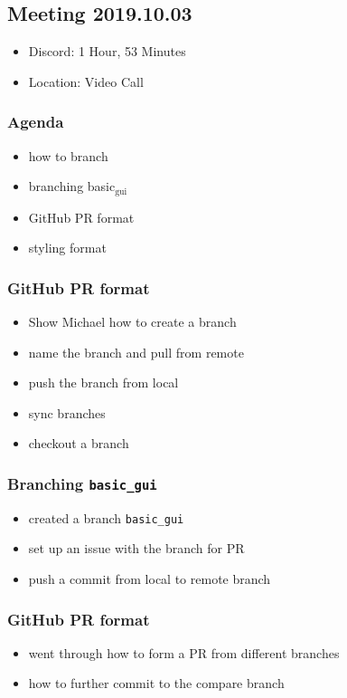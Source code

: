 \documentclass[11pt]{article}
\begin{document}
\subsection{Meeting 2019.10.03}
\label{sec:org9b40e29}
\begin{itemize}
\item Discord: 1 Hour, 53 Minutes
\item Location: Video Call
\end{itemize}
\subsubsection*{Agenda}
\label{sec:org2ff7f02}
\begin{itemize}
\item how to branch
\item branching basic\(_{\text{gui}}\)
\item GitHub PR format
\item styling format
\end{itemize}
\subsubsection*{GitHub PR format}
\label{sec:org42e37cc}
\begin{itemize}
\item Show Michael how to create a branch
\item name the branch and pull from remote
\item push the branch from local
\item sync branches
\item checkout a branch
\end{itemize}
\subsubsection*{Branching \texttt{basic\_gui}}
\label{sec:org59a5e2e}
\begin{itemize}
\item created a branch \texttt{basic\_gui}
\item set up an issue with the branch for PR
\item push a commit from local to remote branch
\end{itemize}
\subsubsection*{GitHub PR format}
\label{sec:org99be226}
\begin{itemize}
\item went through how to form a PR from different branches
\item how to further commit to the compare branch
\end{itemize}
\end{document}
